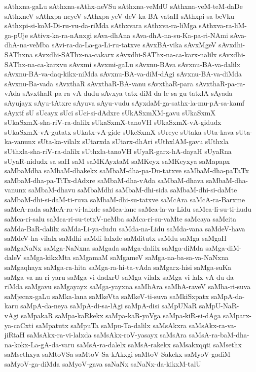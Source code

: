 {sAthxna-gaLu
sAthxna-sAthx-neVSu
sAthxna-veMdU
sAthxna-veM-teM-daDe
sAthxneV
sAthxpa-neyeV
sAthxpa-yeV-deV-ka-BA-vataH
sAthxpi-sa-beVku
sAthxpi-si-koM-Di-ru-vu-da-riMda
sAthxvara
sAthxva-ra-liMga
sAthxva-ra-liM-ga-pUje
sAtivx-ka-ra-nAnxgi
sAva-dhAna
sAva-dhA-na-su-Ka-pa-ri-NAmi
sAva-dhA-na-veMba
sAvi-ra-da-La-ga-Li-ru-tatxve
sAvxBA-vika
sAvxMgeV
sAvxdhi-SAThxna
sAvxdhi-SAThx-na-cakarx
sAvxdhi-SAThx-na-ca-karx-nalilx
sAvxdhi-SAThx-na-ca-karxvu
sAvxmi
sAvxmi-gaLu
sAvxnu-BAva
sAvxnu-BA-va-dalilx
sAvxnu-BA-va-daq-kikx-niMda
sAvxnu-BA-va-diM-dAgi
sAvxnu-BA-va-diMda
sAvxnu-Ba-vada
sAvxthaR
sAvxthaR-BA-vanu
sAvxthaR-para
sAvxthaR-pa-ra-vAda
sAvxthaR-pa-ra-vA-dudu
sAvxya-tatx-diM-da-le-sa-gu-tatxlA
sAyada
sAyujayx
sAyu-tAtxre
sAyuva
sAyu-vudu
sAyxdaM-ga-sathx-la-mu-pA-sa-kamf
sAyxtf
sU
sUcayx
sUci
sUci-si-dAdxre
sUkASxmXM-gavu
sUkaSxmX
sUkaSxmX-sha-riV-ra-dalilx
sUkaSxmX-tanoVH
sUkaSxmX-vA-gidudx
sUkaSxmX-vA-gutatx
sUkatx-vA-gide
sUkeSxmX
sUreye
sUtaka
sUta-kava
sUta-ka-vanunx
sUta-ka-vilalx
sUtarxda
sUtarx-dhAri
sUthxlAM-gavu
sUthxla
sUthxla-sha-riV-ra-dalilx
sUthxla-tanoVH
sUyaR-garx-hA-dayaH
sUyaRna
sUyaR-nidudx
sa
saH
saM
saMKAyxtaM
saMKeyx
saMKeyxya
saMapapx
saMbaMdha
saMbaM-dhakekx
saMbaM-dha-pa-Du-tatxve
saMbaM-dha-paTaTx
saMbaM-dha-pa-TiTx-dAdxre
saMbaM-dha-vAda
saMbaM-dhava
saMbaM-dha-vanunx
saMbaM-dhavu
saMbaMdhi
saMbaM-dhi-sida
saMbaM-dhi-si-daMte
saMbaM-dhi-si-daM-ti-ruva
saMbaM-dhi-su-tatxve
saMcAra
saMcA-ra-Barxme
saMcA-rada
saMcA-ra-vi-lalxde
saMca-lane
saMca-la-va-Lidu
saMca-li-su-ti-hudu
saMca-ri-salu
saMca-ri-su-tetxV-neMba
saMca-ri-su-vaMte
saMcaya
saMcita
saMda-BaR-dalilx
saMda-Li-ya-dudu
saMda-na-Lidu
saMda-vana
saMdeV-hava
saMdeV-ha-vilalx
saMdhi
saMdi-lalxde
saMditutx
saMdu
saMga
saMgaH
saMgaNaNx
saMga-NaNxna
saMgada
saMga-dalilx
saMga-diMda
saMga-diM-daleV
saMga-kikxMta
saMgamaM
saMgameV
saMga-na-ba-sa-va-NaNxna
saMgaqhayx
saMga-ra-hita
saMga-ra-hi-ta-vAda
saMgarx-hisi
saMga-suKa
saMga-va-na-ri-yaru
saMga-vi-dadxrU
saMga-vilalx
saMga-vi-lalx-vA-du-da-riMda
saMgavu
saMgayayx
saMga-yayxna
saMhAra
saMhA-raveV
saMha-ri-suva
saMjecnx-gaLu
saMka-lana
saMkeVta
saMkeV-ti-suva
saMkiSxpatx
saMpA-da-karu
saMpA-da-neya
saMpA-di-sa-lAgi
saMpA-disi
saMpUNaR
saMpU-NaR-vAgi
saMpakaR
saMpa-kaRkekx
saMpa-kaR-yoVga
saMpa-kiR-si-dAga
saMparx-ya-caCxti
saMpatutx
saMpuTa
saMpu-Ta-dalilx
saMsAkxra
saMsAkx-ra-va-jiRtaH
saMsAkx-ra-vi-lalxda
saMsAkx-roV-yasayx
saMsAra
saMsA-ra-baM-dha-na-kokx-La-gA-da-varu
saMsA-ra-dalelx
saMsA-rakekx
saMsakxqqti
saMsethx
saMsethxya
saMtoVSa
saMtoV-Sa-kAkxgi
saMtoV-Sakekx
saMyoV-gadiM
saMyoV-ga-diMda
saMyoV-gava
saNaNx
saNaNx-da-kikxM-talU
}
